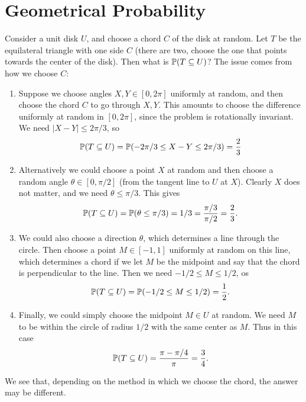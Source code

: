 \section{Geometrical Probability}

\begin{example}
  Consider a unit disk $U$, and choose a chord
  $C$ of the disk at random. Let $T$ be the
  equilateral triangle with one side $C$ (there
  are two, choose the one that points towards the
  center of the disk). Then what is $\mathbb{P}(T \subseteq U)$?
  The issue comes from how we choose $C$:
  \begin{enumerate}
    \item Suppose we choose angles $X, Y \in [0, 2\pi]$
      uniformly at random, and then choose the chord
      $C$ to go through $X, Y$. This amounts to
      choose the difference uniformly at random
      in $[0, 2\pi]$, since the problem is
      rotationally invariant. We need $|X - Y| \le 2\pi / 3$, so
      \[\mathbb{P}(T \subseteq U) = \mathbb{P}(-2\pi / 3 \le X - Y \le 2 \pi / 3) = \frac{2}{3}\]
    \item Alternatively we could choose a point
      $X$ at random and then choose a random angle
      $\theta \in [0, \pi / 2]$ (from the tangent
      line to $U$ at $X$). Clearly $X$ does not
      matter, and we need $\theta \le \pi / 3$.
      This gives
      \[\mathbb{P}(T \subseteq U) =
        \mathbb{P}(\theta \le \pi / 3) = 1 / 3
        = \frac{\pi / 3}{\pi / 2} = \frac{2}{3}.
      \]
    \item We could also choose a direction
      $\theta$, which determines a line through the
      circle. Then choose a point $M \in [-1, 1]$
      uniformly at random on this line, which
      determines a chord if we let $M$ be the
      midpoint and say that the chord is perpendicular
      to the line. Then we need
      $- 1 / 2 \le M \le 1 / 2$, os
      \[
        \mathbb{P}(T \subseteq U) = \mathbb{P}(-1 / 2 \le M \le 1 / 2) =
        \frac{1}{2}.
      \]
    \item Finally, we could simply choose the
      midpoint $M \in U$ at random. We need
      $M$ to be within the circle of radius $1 / 2$
      with the same center as $M$. Thus
      in this case
      \[
        \mathbb{P}(T \subseteq U) = \frac{\pi - \pi / 4}{\pi}
        = \frac{3}{4}.
      \]
  \end{enumerate}
  We see that, depending on the method in
  which we choose the chord, the answer may be
  different.
\end{example}

